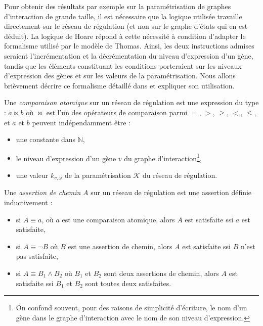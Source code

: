 Pour obtenir des résultats par exemple sur la paramétrisation de graphes d'interaction de grande taille, il est nécessaire que la logique utilisée travaille directement sur le réseau de régulation (et non sur le graphe d'états qui en est déduit). La logique de Hoare répond à cette nécessité à condition d'adapter le formalisme utilisé par le modèle de Thomas. Ainsi, les deux instructions admises seraient l'incrémentation et la décrémentation du niveau d'expression d'un gène, tandis que les éléments constituant les conditions porteraient sur les niveaux d'expression des gènes et sur les valeurs de la paramétrisation. Nous allons brièvement décrire ce formalisme détaillé dans \cite{khalis-bernot-comet-richard-roux-siebert-UnPublished} et expliquer son utilisation.

\begin{definition}
Une \emph{comparaison atomique} sur un réseau de régulation est une expression du type : \og $a \bowtie b$ \fg{} où $\bowtie$ est l'un des opérateurs de comparaison parmi $=$, $>$, $\geq$, $<$, $\leq$, et $a$ et $b$ peuvent indépendamment être :
\begin{itemize}
  \item une constante dans $\mathbb{N}$,
  \item le niveau d'expression d'un gène $v$ du graphe d'interaction\footnote{On confond souvent, pour des raisons de simplicité d'écriture, le nom d'un gène dans le graphe d'interaction avec le nom de son niveau d'expression.},
  \item une valeur $k_{v, \omega}$ de la paramétrisation $\mathcal{K}$ du réseau de régulation.
\end{itemize}
\end{definition}


\begin{definition}
Une \emph{assertion de chemin} $A$ sur un réseau de régulation est une assertion définie inductivement :
\begin{itemize}
  \item si $A \equiv a$, où $a$ est une comparaison atomique, alors $A$ est satisfaite ssi $a$ est satisfaite,
  \item si $A \equiv \neg B$ où $B$ est une assertion de chemin, alors $A$ est satisfaite ssi $B$ n'est pas satisfaite,
  \item si $A \equiv B_1 \wedge B_2$ où $B_1$ et $B_2$ sont deux assertions de chemin, alors $A$ est satisfaite ssi $B_1$ et $B_2$ sont toutes deux satisfaites.
\end{itemize}
\end{definition}

